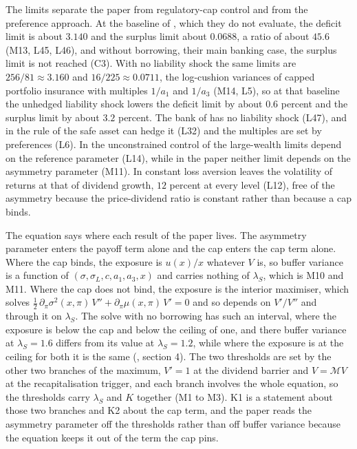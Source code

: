 The limits separate the paper from regulatory-cap control and from the
preference approach. At the baseline of \citet{bayraktar2026}, which they do
not evaluate, the deficit limit is about $3.140$ and the surplus limit about
$0.0688$, a ratio of about $45.6$ (M13, L45, L46), and without borrowing, their
main banking case, the surplus limit is not reached (C3). With no liability
shock the same limits are $256/81\approx3.160$ and $16/225\approx0.0711$, the
log-cushion variances of capped portfolio insurance with multiples $1/a_1$ and
$1/a_3$ (M14, L5), so at that baseline the unhedged liability shock lowers the
deficit limit by about $0.6$ percent and the surplus limit by about $3.2$
percent. The bank of \citet{daihuangkeppo2019} has no liability shock (L47),
and in the rule of \citet{blackperold1992} the safe asset can hedge it (L32)
and the multiples are set by preferences (L6). In the unconstrained control of
\citet{li2023} the large-wealth limits depend on the reference
parameter (L14), while in the paper neither limit depends on the asymmetry
parameter (M11). In \citet{barberis2001} constant loss aversion leaves the
volatility of returns at that of dividend growth, $12$ percent at every level
(L12), free of the asymmetry because the price-dividend ratio is constant
rather than because a cap binds.

The equation says where each result of the paper lives. The asymmetry
parameter enters the payoff term alone and the cap enters the cap term alone.
Where the cap binds, the exposure is $u(x)/x$ whatever $V$ is, so buffer
variance is a function of $(\sigma,\sigma_L,c,a_1,a_3,x)$ and carries nothing
of $\lambda_S$, which is M10 and M11. Where the cap does not bind, the exposure
is the interior maximiser, which solves
$\tfrac12\,\partial_\pi\sigma^2(x,\pi)\,V''+\partial_\pi\mu(x,\pi)\,V'=0$ and so
depends on $V'/V''$ and through it on $\lambda_S$. The solve with no borrowing
has such an interval, where the exposure is below the cap and below the
ceiling of one, and there buffer variance at $\lambda_S=1.6$ differs from its
value at $\lambda_S=1.2$, while where the exposure is at the ceiling for both
it is the same (, section 4). The two thresholds are set by the
other two branches of the maximum, $V'=1$ at the dividend barrier and
$V=\mathcal MV$ at the recapitalisation trigger, and each branch involves the
whole equation, so the thresholds carry $\lambda_S$ and $K$ together (M1 to
M3). K1 is a statement about those two branches and K2 about the cap term, and
the paper reads the asymmetry parameter off the thresholds rather than off
buffer variance because the equation keeps it out of the term the cap pins.

